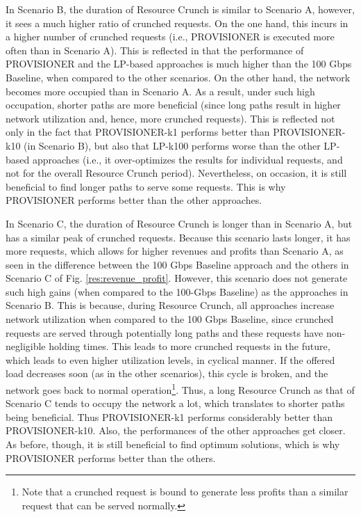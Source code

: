 \documentclass[journal]{IEEEtran}
\begin{document}
In Scenario B, the duration of Resource Crunch is similar to Scenario A, however, it sees a much higher ratio of crunched requests. On the one hand, this incurs in a higher number of crunched requests (i.e., PROVISIONER is executed more often than in Scenario A). This is reflected in that the performance of PROVISIONER and the LP-based approaches is much higher than the 100 Gbps Baseline, when compared to the other scenarios. On the other hand, the network becomes more occupied than in Scenario A. As a result, under such high occupation, shorter paths are more beneficial (since long paths result in higher network utilization and, hence, more crunched requests). This is reflected not only in the fact that PROVISIONER-k1 performs better than PROVISIONER-k10 (in Scenario B), but also that LP-k100 performs worse than the other LP-based approaches (i.e., it over-optimizes the results for individual requests, and not for the overall Resource Crunch period). Nevertheless, on occasion, it is still beneficial to find longer paths to serve some requests. This is why PROVISIONER performs better than the other approaches.

In Scenario C, the duration of Resource Crunch is longer than in Scenario A, but has a similar peak of crunched requests. Because this scenario lasts longer, it has more requests, which allows for higher revenues and profits than Scenario A, as seen in the difference between the 100 Gbps Baseline approach and the others in Scenario C of Fig. \ref{res:revenue_profit}. However, this scenario does not generate such high gains (when compared to the 100-Gbps Baseline) as the approaches in Scenario B.
This is because, during Resource Crunch, all approaches increase network utilization when compared to the 100 Gbps Baseline, since crunched requests are served through potentially long paths and these requests have non-negligible holding times. This leads to more crunched requests in the future, which leads to even higher utilization levels, in cyclical manner. If the offered load decreases soon (as in the other scenarios), this cycle is broken, and the network goes back to normal operation\footnote{Note that a crunched request is bound to generate less profits than a similar request that can be served normally.}. Thus, a long Resource Crunch as that of Scenario C tends to occupy the network a lot, which translates to shorter paths being beneficial. Thus PROVISIONER-k1 performs considerably better than PROVISIONER-k10. Also, the performances of the other approaches get closer. As before, though, it is still beneficial to find optimum solutions, which is why PROVISIONER performs better than the others.
\end{document}
